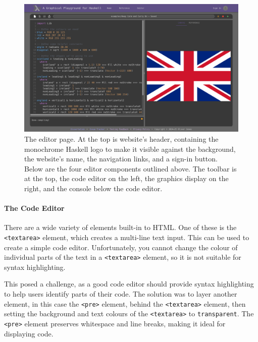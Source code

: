 \documentclass[../main.tex]{subfiles}
\begin{document}
                \begin{figure}[H]
                    \centering
                    \includegraphics[width=0.75\linewidth]{images/editor.png}
                        \caption{The editor page.
                            At the top is website's header, containing the monochrome Haskell logo to make
                                it visible against the background, the website's name, the navigation links,
                                and a sign-in button.
                            Below are the four editor components outlined above.
                            The toolbar is at the top, the code editor on the left, the graphics display on
                                the right, and the console below the code editor.
                        }
                        \label{fig:editor}
                \end{figure}

                \paragraph{The Code Editor}
                    There are a wide variety of elements built-in to HTML.
                    One of these is the \texttt{<textarea>} element, which creates a multi-line
                        text input.
                    This can be used to create a simple code editor.
                    Unfortunately, you cannot change the colour of individual parts of the text in
                        a \texttt{<textarea>} element, so it is not suitable for syntax highlighting.

                    This posed a challenge, as a good code editor should provide syntax
                        highlighting to help users identify parts of their code.
                    The solution was to layer another element, in this case the \texttt{<pre>}
                        element, behind the \texttt{<textarea>} element, then setting the background
                        and text colours of the \texttt{<textarea>} to \texttt{transparent}.
                    The \texttt{<pre>} element preserves whitespace and line breaks, making it
                        ideal for displaying code.
\end{document}
